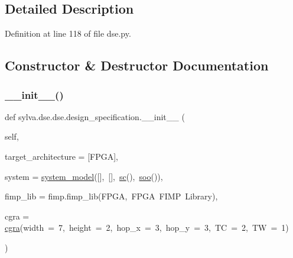 \subsection{Detailed Description}


Definition at line 118 of file dse.\+py.



\subsection{Constructor \& Destructor Documentation}
\mbox{\label{classsylva_1_1dse_1_1dse_1_1design__specification_a663ec78bf7e1432ce1bcdb32272e5c78}} 
\subsubsection{\texorpdfstring{\+\_\+\+\_\+init\+\_\+\+\_\+()}{\_\_init\_\_()}}
{\footnotesize\ttfamily def sylva.\+dse.\+dse.\+design\+\_\+specification.\+\_\+\+\_\+init\+\_\+\+\_\+ (\begin{DoxyParamCaption}\item[{}]{self,  }\item[{}]{target\+\_\+architecture = {\ttfamily \mbox{[}\textquotesingle{}FPGA\textquotesingle{}\mbox{]}},  }\item[{}]{system = {\ttfamily \hyperlink{classsylva_1_1dse_1_1dse_1_1system__model}{system\+\_\+model}(\mbox{[}\mbox{]},~\mbox{[}\mbox{]},~\hyperlink{namespacesylva_1_1dse_1_1dse_ac2d9fdcc3f7fd0bad1900fa0a813dff4}{sc}(),~\hyperlink{namespacesylva_1_1dse_1_1dse_ab54fbae03bc2c432fecd4486e623af71}{soo}())},  }\item[{}]{fimp\+\_\+lib = {\ttfamily fimp.fimp\+\_\+lib(\textquotesingle{}FPGA\textquotesingle{},~\textquotesingle{}FPGA~FIMP~Library\textquotesingle{})},  }\item[{}]{cgra = {\ttfamily \hyperlink{classsylva_1_1base_1_1cgra_1_1cgra}{cgra}(width~=~7,~height~=~2,~hop\+\_\+x~=~3,~hop\+\_\+y~=~3,~TC~=~2,~TW~=~1)} }\end{DoxyParamCaption})}



